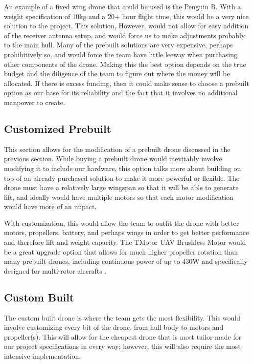 \documentclass[onecolumn, draftclsnofoot,10pt, compsoc]{IEEEtran}
\begin{document}
An example of a fixed wing drone that could be used is the Penguin B. With a weight specification of 10kg and a 20+ hour flight time, this would be a very nice solution to the project\cite{PenguinPrebuilt}. This solution, However, would not allow for easy addition of the receiver antenna setup, and would force us to make adjustments probably to the main hull. Many of the prebuilt solutions are very expensive, perhaps prohibitively so, and would force the team have little leeway when purchasing other components of the drone. Making this the best option depends on the true budget and the diligence of the team to figure out where the money will be allocated. If there is excess funding, then it could make sense to choose a prebuilt option as our base for its reliability and the fact that it involves no additional manpower to create.

\subsection{Customized Prebuilt}

This section allows for the modification of a prebuilt drone discussed in the previous section. While buying a prebuilt drone would inevitably involve modifying it to include our hardware, this option talks more about building on top of an already purchased solution to make it more powerful or flexible. The drone must have a relatively large wingspan so that it will be able to generate lift, and ideally would have multiple motors so that each motor modification would have more of an impact.

With customization, this would allow the team to outfit the drone with better motors, propellers, battery, and perhaps wings in order to get better performance and therefore lift and weight capacity. The TMotor UAV Brushless Motor would be a great upgrade option that allows for much higher propeller rotation than many prebuilt drones, including continuous power of up to 430W and specifically designed for multi-rotor aircrafts \cite{TMotorUAV}.

\subsection{Custom Built}

The custom built drone is where the team gets the most flexibility. This would involve customizing every bit of the drone, from hull body to motors and propeller(s). This will allow for the cheapest drone that is most tailor-made for our project specifications in every way; however, this will also require the most intensive implementation.
\end{document}

